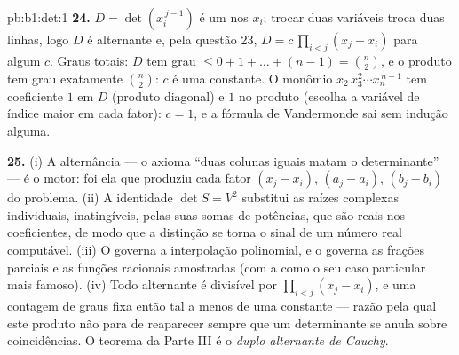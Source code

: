 \begin{solution}{pb:b1:det:1}
\textbf{24.} $D = \det(x_i^{\,j-1})$ é um  nos $x_i$; trocar duas variáveis
troca duas linhas, logo $D$ é alternante e, pela questão 23, $D = c\,\prod_{i<j}(x_j - x_i)$
para algum  $c$. Graus totais: $D$ tem grau $\leq 0 +
1 + \dots + (n-1) = \binom n2$, e o
produto tem grau exatamente $\binom n2$: $c$ é uma constante. O monômio
$x_2\,x_3^2\cdots
x_n^{\,n-1}$ tem coeficiente $1$ em $D$ (produto diagonal) e $1$ no produto
(escolha a variável de índice maior em cada fator): $c = 1$, e a
fórmula de Vandermonde sai sem indução alguma.

\textbf{25.} (i) A alternância --- o axioma ``duas colunas iguais
matam o determinante'' --- é o motor: foi ela que produziu cada
fator $(x_j - x_i)$, $(a_j - a_i)$, $(b_j - b_i)$ do problema. (ii) A identidade $\det S = V^2$
substitui as raízes complexas individuais, inatingíveis, pelas suas
somas de potências, que são  reais nos coeficientes, de
modo que a distinção se torna o sinal de um número real computável.
(iii) O  governa a interpolação
polinomial, e o  governa as frações parciais e
as funções racionais amostradas (com a  como o seu
caso particular mais famoso). (iv) Todo  alternante é
divisível por $\prod_{i<j}(x_j - x_i)$, e uma contagem de graus fixa então tal
 a menos de uma constante --- razão pela qual este produto
não para de reaparecer sempre que um determinante se anula sobre
coincidências. O teorema da Parte III é o \emph{duplo alternante de
Cauchy}.
\end{solution}
